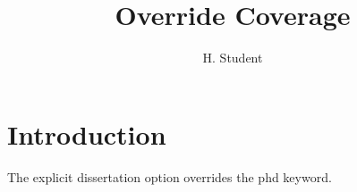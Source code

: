 \documentclass[phd,dissertation,12pt,a4paper]{bangorthesis}
\title{Override Coverage}
\author{H. Student}
\begin{document}
\maketitle
{}
\chapter{Introduction}
The explicit dissertation option overrides the phd keyword.
\end{document}
